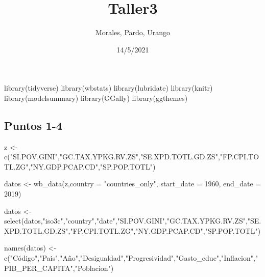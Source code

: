 \documentclass[
]{article}
\title{Taller3}
\author{Morales, Pardo, Urango}
\date{14/5/2021}
\newenvironment{Shaded}{\begin{snugshade}}{\end{snugshade}}
\newcommand{\AttributeTok}[1]{\textcolor[rgb]{0.77,0.63,0.00}{#1}}
\newcommand{\DecValTok}[1]{\textcolor[rgb]{0.00,0.00,0.81}{#1}}
\newcommand{\FunctionTok}[1]{\textcolor[rgb]{0.00,0.00,0.00}{#1}}
\newcommand{\NormalTok}[1]{#1}
\newcommand{\OtherTok}[1]{\textcolor[rgb]{0.56,0.35,0.01}{#1}}
\newcommand{\StringTok}[1]{\textcolor[rgb]{0.31,0.60,0.02}{#1}}
\begin{document}
\maketitle

\begin{Shaded}
\begin{Highlighting}[]
\FunctionTok{library}\NormalTok{(tidyverse)}
\FunctionTok{library}\NormalTok{(wbstats)}
\FunctionTok{library}\NormalTok{(lubridate)}
\FunctionTok{library}\NormalTok{(knitr)}
\FunctionTok{library}\NormalTok{(modelsummary)}
\FunctionTok{library}\NormalTok{(GGally)}
\FunctionTok{library}\NormalTok{(ggthemes)}
\end{Highlighting}
\end{Shaded}

\hypertarget{puntos-1-4}{%
\subsection{Puntos 1-4}\label{puntos-1-4}}

\begin{Shaded}
\begin{Highlighting}[]
\NormalTok{z }\OtherTok{\textless{}{-}} \FunctionTok{c}\NormalTok{(}\StringTok{"SI.POV.GINI"}\NormalTok{,}\StringTok{"GC.TAX.YPKG.RV.ZS"}\NormalTok{,}\StringTok{"SE.XPD.TOTL.GD.ZS"}\NormalTok{,}\StringTok{"FP.CPI.TOTL.ZG"}\NormalTok{,}\StringTok{"NY.GDP.PCAP.CD"}\NormalTok{,}\StringTok{"SP.POP.TOTL"}\NormalTok{)}

\NormalTok{datos }\OtherTok{\textless{}{-}} \FunctionTok{wb\_data}\NormalTok{(z,}\AttributeTok{country =} \StringTok{"countries\_only"}\NormalTok{, }\AttributeTok{start\_date =} \DecValTok{1960}\NormalTok{, }\AttributeTok{end\_date =} \DecValTok{2019}\NormalTok{)}
\end{Highlighting}
\end{Shaded}

\begin{Shaded}
\begin{Highlighting}[]
\NormalTok{datos }\OtherTok{\textless{}{-}} \FunctionTok{select}\NormalTok{(datos,}\StringTok{"iso3c"}\NormalTok{,}\StringTok{"country"}\NormalTok{,}\StringTok{"date"}\NormalTok{,}\StringTok{"SI.POV.GINI"}\NormalTok{,}\StringTok{"GC.TAX.YPKG.RV.ZS"}\NormalTok{,}\StringTok{"SE.XPD.TOTL.GD.ZS"}\NormalTok{,}\StringTok{"FP.CPI.TOTL.ZG"}\NormalTok{,}\StringTok{"NY.GDP.PCAP.CD"}\NormalTok{,}\StringTok{"SP.POP.TOTL"}\NormalTok{)}

\FunctionTok{names}\NormalTok{(datos) }\OtherTok{\textless{}{-}} \FunctionTok{c}\NormalTok{(}\StringTok{"Código"}\NormalTok{,}\StringTok{"Pais"}\NormalTok{,}\StringTok{"Año"}\NormalTok{,}\StringTok{"Desigualdad"}\NormalTok{,}\StringTok{"Progresividad"}\NormalTok{,}\StringTok{"Gasto\_educ"}\NormalTok{,}\StringTok{"Inflacion"}\NormalTok{,}\StringTok{"PIB\_PER\_CAPITA"}\NormalTok{,}\StringTok{"Poblacion"}\NormalTok{)}
\end{Highlighting}
\end{Shaded}
\end{document}
